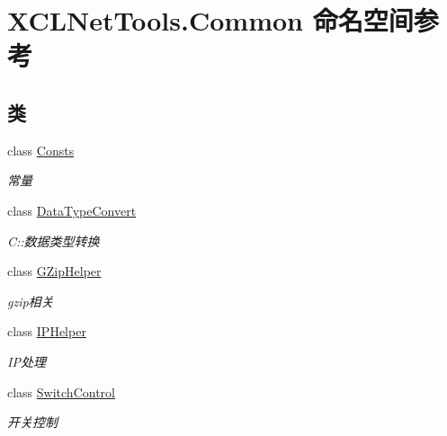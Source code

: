 \hypertarget{namespace_x_c_l_net_tools_1_1_common}{}\section{X\+C\+L\+Net\+Tools.\+Common 命名空间参考}
\label{namespace_x_c_l_net_tools_1_1_common}
\subsection*{类}
\begin{DoxyCompactItemize}
\item 
class \hyperlink{class_x_c_l_net_tools_1_1_common_1_1_consts}{Consts}
\begin{DoxyCompactList}\small\item\em 常量 \end{DoxyCompactList}\item 
class \hyperlink{class_x_c_l_net_tools_1_1_common_1_1_data_type_convert}{Data\+Type\+Convert}
\begin{DoxyCompactList}\small\item\em C\+::数据类型转换 \end{DoxyCompactList}\item 
class \hyperlink{class_x_c_l_net_tools_1_1_common_1_1_g_zip_helper}{G\+Zip\+Helper}
\begin{DoxyCompactList}\small\item\em gzip相关 \end{DoxyCompactList}\item 
class \hyperlink{class_x_c_l_net_tools_1_1_common_1_1_i_p_helper}{I\+P\+Helper}
\begin{DoxyCompactList}\small\item\em I\+P处理 \end{DoxyCompactList}\item 
class \hyperlink{class_x_c_l_net_tools_1_1_common_1_1_switch_control}{Switch\+Control}
\begin{DoxyCompactList}\small\item\em 开关控制 \end{DoxyCompactList}\end{DoxyCompactItemize}
